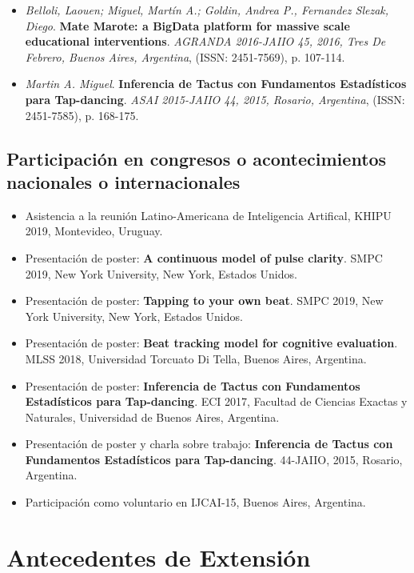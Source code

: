 \documentclass[a4paper,10pt]{article}
\begin{document}
\begin{itemize}
    \item 
\emph{Belloli, Laouen; Miguel, Martín A.; Goldin, Andrea P., Fernandez Slezak,
        Diego}.
\textbf{Mate Marote: a BigData platform for massive scale educational
        interventions}.
        \emph{AGRANDA 2016-JAIIO 45, 2016, Tres De Febrero, Buenos Aires,
        Argentina}, (ISSN: 2451-7569), p. 107-114.
    \item 
\emph{Martin A. Miguel}.
\textbf{Inferencia de Tactus con Fundamentos Estadísticos para Tap-dancing}.
        \emph{ASAI 2015-JAIIO 44, 2015, Rosario, Argentina}, (ISSN: 2451-7585),
        p. 168-175.
\end{itemize}

\subsection{Participación en congresos o acontecimientos nacionales o
internacionales}

\begin{itemize}
    \item Asistencia a la reunión Latino-Americana de Inteligencia Artifical,
        KHIPU 2019, Montevideo, Uruguay.
    \item Presentación de poster:
        \textbf{A continuous model of pulse clarity}.
        SMPC 2019, New York University, New York, Estados Unidos.
    \item Presentación de poster:
        \textbf{Tapping to your own beat}.
        SMPC 2019, New York University, New York, Estados Unidos.
    \item Presentación de poster:
        \textbf{Beat tracking model for cognitive evaluation}.
        MLSS 2018, Universidad Torcuato Di Tella, Buenos Aires, Argentina.
    \item Presentación de poster: \textbf{Inferencia de Tactus con Fundamentos Estadísticos para
Tap-dancing}.
    ECI 2017, Facultad de Ciencias Exactas y Naturales, Universidad de Buenos
        Aires, Argentina.
    \item Presentación de poster y charla sobre trabajo:
\textbf{Inferencia de Tactus con Fundamentos Estadísticos para
        Tap-dancing}. 44-JAIIO, 2015, Rosario, Argentina.
    \item Participación como voluntario en IJCAI-15, Buenos Aires, Argentina.
\end{itemize}

\section{Antecedentes de Extensión}
\end{document}
